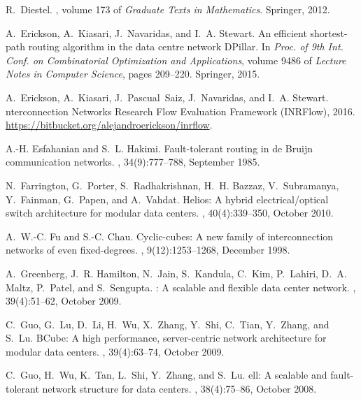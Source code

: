 \documentclass[]{amsart}
\begin{document}
{\begin{thebibliography}{10}
R.~Diestel.
, volume 173 of {\em Graduate Texts in
  Mathematics}.
\newblock Springer, 2012.

A.~Erickson, A.~Kiasari, J.~Navaridas, and I.~A. Stewart.
\newblock An efficient shortest-path routing algorithm in the data centre
  network {DP}illar.
\newblock In {\em Proc. of 9th Int. Conf. on Combinatorial Optimization and
  Applications}, volume 9486 of {\em Lecture Notes in Computer Science}, pages
  209--220. Springer, 2015.

A.~Erickson, A.~Kiasari, J.~Pascual~Saiz, J.~Navaridas, and I.~A. Stewart.
nterconnection {N}etworks {R}esearch {F}low {E}valuation
  {F}ramework ({INRFlow}), 2016.
\newblock [Software] \url{https://bitbucket.org/alejandroerickson/inrflow}.

A.-H. Esfahanian and S.~L. Hakimi.
\newblock Fault-tolerant routing in de {B}ruijn communication networks.
, 34(9):777--788, September 1985.

N.~Farrington, G.~Porter, S.~Radhakrishnan, H.~H. Bazzaz, V.~Subramanya,
  Y.~Fainman, G.~Papen, and A.~Vahdat.
\newblock Helios: A hybrid electrical/optical switch architecture for modular
  data centers.
, 40(4):339--350, October
  2010.

A.~W.-C. Fu and S.-C. Chau.
\newblock Cyclic-cubes: A new family of interconnection networks of even
  fixed-degrees.
,
  9(12):1253--1268, December 1998.

A.~Greenberg, J.~R. Hamilton, N.~Jain, S.~Kandula, C.~Kim, P.~Lahiri, D.~A.
  Maltz, P.~Patel, and S.~Sengupta.
: A scalable and flexible data center network.
, 39(4):51--62, October
  2009.

C.~Guo, G.~Lu, D.~Li, H.~Wu, X.~Zhang, Y.~Shi, C.~Tian, Y.~Zhang, and S.~Lu.
\newblock B{C}ube: A high performance, server-centric network architecture for
  modular data centers.
, 39(4):63--74, October
  2009.

C.~Guo, H.~Wu, K.~Tan, L.~Shi, Y.~Zhang, and S.~Lu.
ell: A scalable and fault-tolerant network structure for data
  centers.
, 38(4):75--86, October
  2008.


\end{thebibliography}}
\end{document}
